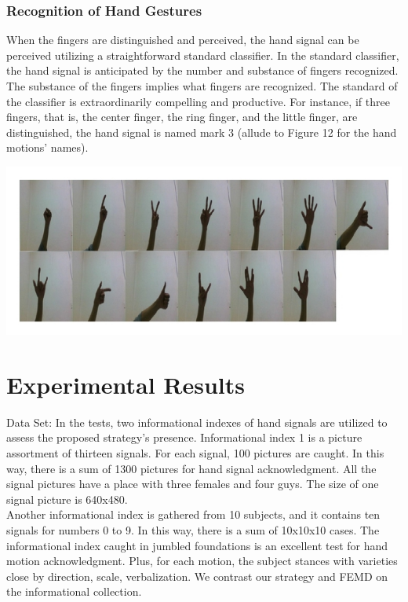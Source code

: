 \documentclass[a4paper]{article}
\begin{document}
\subsubsection{Recognition of Hand Gestures}
When the fingers are distinguished and perceived, the hand signal can be perceived utilizing a straightforward standard classifier. In the standard classifier, the hand signal is anticipated by the number and substance of fingers recognized. The substance of the fingers implies what fingers are recognized. The standard of the classifier is extraordinarily compelling and productive. For instance, if three fingers, that is, the center finger, the ring finger, and the little finger, are distinguished, the hand signal is named mark 3 (allude to Figure 12 for the hand motions' names).

\begin{center}
\includegraphics[scale=2.8]{Fig12}
\end{center}


\section{Experimental Results} 
Data Set:
\linebreak
In the tests, two informational indexes of hand signals are utilized to assess the proposed strategy's presence. Informational index 1 is a picture assortment of thirteen signals. For each signal, 100 pictures are caught. In this way, there is a sum of 1300 pictures for hand signal acknowledgment. All the signal pictures have a place with three females and four guys. The size of one signal picture is 640x480.
\\
Another informational index is gathered from 10 subjects, and it contains ten signals for numbers 0 to 9. In this way, there is a sum of 10x10x10 cases. The informational index caught in jumbled foundations is an excellent test for hand motion acknowledgment. Plus, for each motion, the subject stances with varieties close by direction, scale, verbalization. We contrast our strategy and FEMD on the informational collection. 
\\
\end{document}
